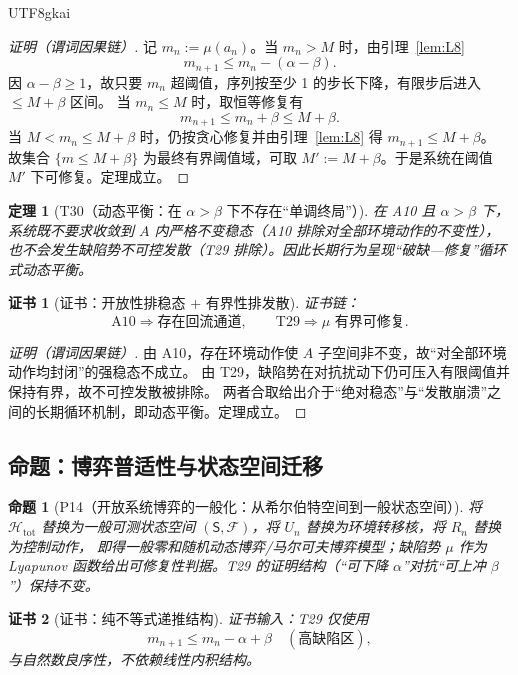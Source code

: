 \documentclass[12pt]{article}
\newtheorem{theorem}{定理}[section]
\newtheorem{proposition}{命题}[section]
\newtheorem{Certificate}{证书}[section]
\begin{document}
\begin{CJK*}{UTF8}{gkai}
\begin{proof}[证明（谓词因果链）]
记 $m_n:=\mu(a_n)$。当 $m_n>M$ 时，由引理~\ref{lem:L8}
\[
m_{n+1}\le m_n-(\alpha-\beta).
\]
因 $\alpha-\beta\ge 1$，故只要 $m_n$ 超阈值，序列按至少 1 的步长下降，有限步后进入 $\le M+\beta$ 区间。
当 $m_n\le M$ 时，取恒等修复有
\[
m_{n+1}\le m_n+\beta\le M+\beta.
\]
当 $M<m_n\le M+\beta$ 时，仍按贪心修复并由引理~\ref{lem:L8} 得 $m_{n+1}\le M+\beta$。
故集合 $\{m\le M+\beta\}$ 为最终有界阈值域，可取 $M':=M+\beta$。于是系统在阈值 $M'$ 下可修复。定理成立。
\end{proof}

\begin{theorem}[T30（动态平衡：在 $\alpha>\beta$ 下不存在“单调终局”）]
\label{thm:T30}
在 A10 且 $\alpha>\beta$ 下，系统既不要求收敛到 $A$ 内严格不变稳态（A10 排除对全部环境动作的不变性），也不会发生缺陷势不可控发散（T29 排除）。因此长期行为呈现“破缺—修复”循环式动态平衡。
\end{theorem}

\begin{Certificate}[证书：开放性排稳态 + 有界性排发散]
\label{cert:T30}
证书链：
\[
\text{A10}\Rightarrow \text{存在回流通道},\qquad
\text{T29}\Rightarrow \mu\text{ 有界可修复}.
\]
\end{Certificate}

\begin{proof}[证明（谓词因果链）]
由 A10，存在环境动作使 $A$ 子空间非不变，故“对全部环境动作均封闭”的强稳态不成立。
由 T29，缺陷势在对抗扰动下仍可压入有限阈值并保持有界，故不可控发散被排除。
两者合取给出介于“绝对稳态”与“发散崩溃”之间的长期循环机制，即动态平衡。定理成立。
\end{proof}

\subsection{命题：博弈普适性与状态空间迁移}

\begin{proposition}[P14（开放系统博弈的一般化：从希尔伯特空间到一般状态空间）]
\label{prop:P14}
将 $\mathcal H_{\mathrm{tot}}$ 替换为一般可测状态空间 $(\mathsf S,\mathcal F)$，将 $U_n$ 替换为环境转移核，将 $R_n$ 替换为控制动作，
  即得一般零和随机动态博弈/马尔可夫博弈模型；缺陷势 $\mu$ 作为 Lyapunov 函数给出可修复性判据。T29 的证明结构（“可下降 $\alpha$”对抗“可上冲 $\beta$”）保持不变。
\end{proposition}

\begin{Certificate}[证书：纯不等式递推结构]
\label{cert:P14}
证书输入：T29 仅使用
\[
m_{n+1}\le m_n-\alpha+\beta\quad(\text{高缺陷区}),
\]
与自然数良序性，不依赖线性内积结构。
\end{Certificate}


\end{CJK*}
\end{document}
